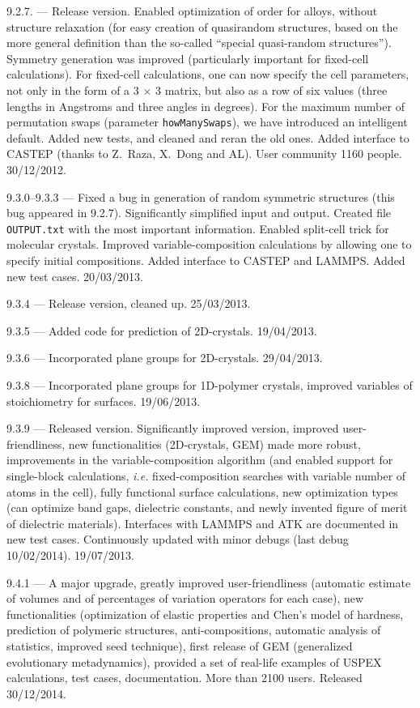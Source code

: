 \documentclass[12pt]{article}
\newcommand{\keyword}[1]{\texttt{#1}}
\newcommand{\file}[1]{\texttt{#1}}
\begin{document}
{9.2.7. --- Release version. Enabled optimization of order for alloys, without
structure relaxation (for easy creation of quasirandom structures, based on the
more general definition than the so-called ``special quasi-random structures'').
Symmetry generation was improved (particularly important for fixed-cell
calculations). For fixed-cell calculations, one can now specify the cell
parameters, not only in the form of a 3 $\times$ 3 matrix, but also as a row of
six values (three lengths in Angstroms and three angles in degrees). For the
maximum number of permutation swaps (parameter \keyword{howManySwaps}), we have
introduced an intelligent default. Added new tests, and cleaned and reran the
old ones. Added interface to CASTEP (thanks to Z.~Raza, X.~Dong and AL). User
community 1160 people. 30/12/2012.

9.3.0--9.3.3 --- Fixed a bug in generation of random symmetric structures (this
bug appeared in 9.2.7). Significantly simplified input and output. Created file
\file{OUTPUT.txt} with the most important information. Enabled split-cell trick
for molecular crystals. Improved variable-composition calculations by allowing
one to specify initial compositions. Added interface to CASTEP and LAMMPS. Added
new test cases. 20/03/2013.

9.3.4 --- Release version, cleaned up. 25/03/2013. 

9.3.5 --- Added code for prediction of 2D-crystals. 19/04/2013.

9.3.6 --- Incorporated plane groups for 2D-crystals. 29/04/2013.

9.3.8 --- Incorporated plane groups for 1D-polymer crystals, improved variables
of stoichiometry for surfaces. 19/06/2013.

9.3.9 --- Released version. Significantly improved version, improved
user-friendliness, new functionalities (2D-crystals, GEM) made more robust,
improvements in the variable-composition algorithm (and enabled support for
single-block calculations, \emph{i.e.} fixed-composition searches with variable
number of atoms in the cell), fully functional surface calculations, new
optimization types (can optimize band gaps, dielectric constants, and newly
invented figure of merit of dielectric materials). Interfaces with LAMMPS and
ATK are documented in new test cases. Continuously updated with minor debugs
(last debug 10/02/2014). 19/07/2013.

9.4.1 --- A major upgrade, greatly improved user-friendliness (automatic
estimate of volumes and of percentages of variation operators for each case),
new functionalities (optimization of elastic properties and Chen's model of
hardness, prediction of polymeric structures, anti-compositions, automatic
analysis of statistics, improved seed technique), first release of GEM
(generalized evolutionary metadynamics), provided a set of real-life examples of
USPEX calculations, test cases, documentation.
More than 2100 users. Released 30/12/2014.

}
\end{document}
